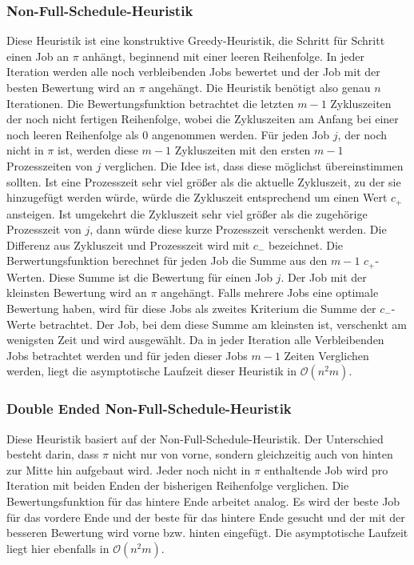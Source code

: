 \documentclass{scrreprt}
\begin{document}
\subsubsection{Non-Full-Schedule-Heuristik}
Diese Heuristik ist eine konstruktive Greedy-Heuristik, die Schritt für Schritt einen Job an $\pi$ anhängt, beginnend mit einer leeren Reihenfolge.
In jeder Iteration werden alle noch verbleibenden Jobs bewertet und der Job mit der besten Bewertung wird an $\pi$ angehängt.
Die Heuristik benötigt also genau $n$ Iterationen.
Die Bewertungsfunktion betrachtet die letzten $m-1$ Zykluszeiten der noch nicht fertigen Reihenfolge, 
wobei die Zykluszeiten am Anfang bei einer noch leeren Reihenfolge als $0$ angenommen werden.
Für jeden Job $j$, der noch nicht in $\pi$ ist, werden diese $m-1$ Zykluszeiten mit den ersten $m-1$ Prozesszeiten von $j$ verglichen.
Die Idee ist, dass diese möglichst übereinstimmen sollten. Ist eine Prozesszeit sehr viel größer als die aktuelle Zykluszeit,
zu der sie hinzugefügt werden würde, würde die Zykluszeit entsprechend um einen Wert $c_+$ ansteigen.
Ist umgekehrt die Zykluszeit sehr viel größer als die zugehörige Prozesszeit von $j$, dann würde diese kurze Prozesszeit verschenkt werden.
Die Differenz aus Zykluszeit und Prozesszeit wird mit $c_-$ bezeichnet.
Die Berwertungsfunktion berechnet für jeden Job die Summe aus den $m-1$ $c_+$-Werten.
Diese Summe ist die Bewertung für einen Job $j$. Der Job mit der kleinsten Bewertung wird an $\pi$ angehängt.
Falls mehrere Jobs eine optimale Bewertung haben, wird für diese Jobs als zweites Kriterium die Summe der $c_-$-Werte betrachtet.
Der Job, bei dem diese Summe am kleinsten ist, verschenkt am wenigsten Zeit und wird ausgewählt.
Da in jeder Iteration alle Verbleibenden Jobs betrachtet werden und für jeden dieser Jobs $m-1$ Zeiten Verglichen werden,
liegt die asymptotische Laufzeit dieser Heuristik in $\mathcal{O}(n^2m)$.

\subsubsection{Double Ended Non-Full-Schedule-Heuristik}
Diese Heuristik basiert auf der Non-Full-Schedule-Heuristik.
Der Unterschied besteht darin, dass $\pi$ nicht nur von vorne, sondern gleichzeitig auch von hinten zur Mitte hin aufgebaut wird.
Jeder noch nicht in $\pi$ enthaltende Job wird pro Iteration mit beiden Enden der bisherigen Reihenfolge verglichen.
Die Bewertungsfunktion für das hintere Ende arbeitet analog.
Es wird der beste Job für das vordere Ende und der beste für das hintere Ende gesucht und der mit der besseren Bewertung wird vorne bzw. hinten eingefügt.
Die asymptotische Laufzeit liegt hier ebenfalls in $\mathcal{O}(n^2m)$.
\end{document}
